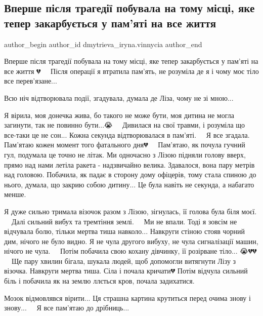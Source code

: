  
 
 
 
 

\subsection{Вперше після трагедії побувала на тому місці, яке тепер закарбується у пам'яті на все життя}
\label{sec:11_08_2022.fb.dmytrieva_iryna.vinnycia.1.vpershe_p_slya_trage}

\ifcmt
 author_begin
   author_id dmytrieva_iryna.vinnycia
 author_end
\fi

Вперше після трагедії побувала на тому місці, яке тепер закарбується у пам'яті
на все життя 💔
⠀
Після операції я втратила пам'ять, не розуміла де я і чому моє тіло все перев'язане...

Всю ніч відтворювала події, згадувала, думала де Ліза, чому не зі мною...

Я вірила, моя донечка жива, бо такого не може бути, моя дитина не могла
загинути, так не повинно бути...😭
⠀
Дивилася на свої травми, і розуміла що все-таки це не сон... Кожна секунда
відтворювалася в пам'яті.
⠀
Я все згадала. Пам'ятаю кожен момент того фатального дня💔
⠀
Пам'ятаю, як почула гучний гул, подумала це точно не літак. Ми одночасно з
Лізою підняли голову вверх, прямо над нами летіла ракета - надзвичайно велика.
Здавалося, вона пару метрів над головою. Побачила, як падає в сторону дому
офіцерів, тому стала спиною до нього, думала, що закрию собою дитину... Це була
навіть не секунда, а набагато менше.  ⠀

Я дуже сильно тримала візочок разом з Лізою, зігнулась, її голова була біля
моєї.
⠀
Далі сильний вибух та тремтіння землі.
⠀
Ми не впали. Тоді я зовсім не відчувала болю, тільки мертва тиша навколо...
Навкруги стіною стояв чорний дим, нічого не було видно.
Я не чула другого вибуху, не чула сигналізації машин, нічого не чула.
⠀
Потім побачила свою кохану дівчинку, її розірване тіло... 😭💔💔
⠀
Ще пару хвилин бігала, шукала людей, щоб допомогли витягнути Лізу з візочка.
Навкруги мертва тиша. Сіла і почала кричати💔 Потім відчула сильний біль і
побачила як на землю ллється кров, почала задихатися.

Мозок відмовлявся вірити... Ця страшна картина крутиться перед очима знову і знову...
⠀
Я все пам'ятаю до дрібниць...
